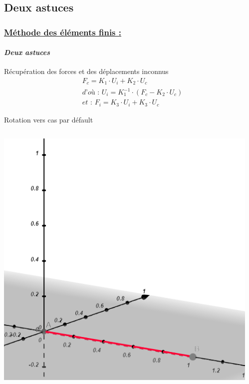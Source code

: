 \documentclass[10pt]{beamer}
\begin{document}
	\subsection{Deux astuces}
	\begin{frame}
		\frametitle{\uline{M\'ethode des \'el\'ements finis :}}
		\framesubtitle{\textit{Deux astuces}}
		\begin{block}{R\'ecup\'eration des forces et des d\'eplacements inconnus}
			\begin{align}
				&F_c = K_1 \cdot U_i + K_2 \cdot U_c\\
				&\textit{d'o\`u : } U_i = K_1^{-1} \cdot (F_c - K_2 \cdot U_c)\\
				&\textit{et : } F_i = K_3 \cdot U_i + K_3 \cdot U_c
			\end{align}
		\end{block}
		\begin{block}{Rotation vers cas par d\'efault}
			\begin{columns}[t]
  				\begin{column}{5cm}
  					\centering
  					\includegraphics[scale=0.2]{Images/CasDeBase.png}
  				\end{column}
 				\begin{column}{5cm}
 				 	\centering

\end{column}
\end{columns}
\end{block}
\end{frame}
\end{document}
